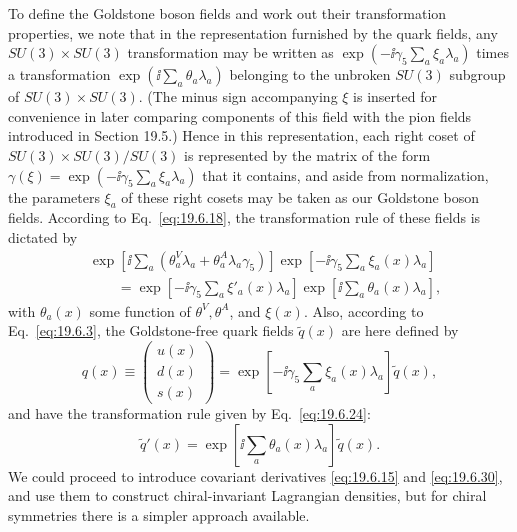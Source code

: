 To define the Goldstone boson fields and work out their transformation properties, we note that in the representation furnished by the quark fields, any $SU(3)\times SU(3)$ transformation may be written as $\exp(-\ii\gamma_5\sum_a\xi_a\lambda_a)$ times a transformation $\exp(\ii\sum_a\theta_a\lambda_a)$ belonging to the unbroken $SU(3)$ subgroup of $SU(3)\times SU(3)$. (The minus sign accompanying $\xi$ is inserted for convenience in later comparing components of this field with the pion fields introduced in Section 19.5.) Hence in this representation, each right coset of $SU(3)\times SU(3)/SU(3)$ is represented by the matrix of the form $\gamma(\xi)=\exp(-\ii\gamma_5\sum_a\xi_a\lambda_a)$ that it contains, and aside from normalization, the parameters $\xi_a$ of these right cosets may be taken as our Goldstone boson fields. According to Eq.~\eqref{eq:19.6.18}, the transformation rule of these fields is dictated by
\begin{equation}
\begin{split}
&\exp\left[\ii\sum_a\left(\theta_a^V\lambda_a+
\theta_a^A\lambda_a\gamma_5\right)\right]
\exp\left[-\ii\gamma_5\sum_a\xi_a(x)\lambda_a\right]
\\
&\qquad
=\exp\left[-\ii\gamma_5\sum_a\xi'_a(x)\lambda_a\right]
\exp\left[\ii\sum_a\theta_a(x)\lambda_a\right],
\end{split}
\tag{19.7.3}\label{eq:19.7.3}
\end{equation}
with $\theta_a(x)$ some function of $\theta^V,\theta^A$, and $\xi(x)$. Also, according to Eq.~\eqref{eq:19.6.3}, the Goldstone-free quark fields $\widetilde q(x)$ are here defined by
\begin{equation}
q(x)\equiv
\begin{pmatrix}u(x)\\d(x)\\s(x)\end{pmatrix}
=\exp\left[-\ii\gamma_5\sum_a\xi_a(x)\lambda_a\right]\widetilde q(x),
\tag{19.7.4}\label{eq:19.7.4}
\end{equation}
and have the transformation rule given by Eq.~\eqref{eq:19.6.24}:
\begin{equation}
\widetilde q'(x)
=\exp\left[\ii\sum_a\theta_a(x)\lambda_a\right]\widetilde q(x).
\tag{19.7.5}\label{eq:19.7.5}
\end{equation}
We could proceed to introduce covariant derivatives \eqref{eq:19.6.15} and \eqref{eq:19.6.30}, and use them to construct chiral-invariant Lagrangian densities, but for chiral symmetries there is a simpler approach available.


